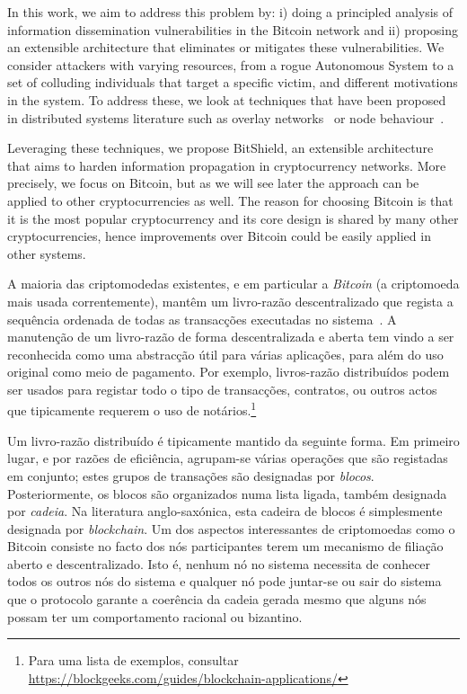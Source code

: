 In this work, we aim to address this problem by: i) doing a principled analysis of information dissemination vulnerabilities in the Bitcoin network and ii) proposing an extensible architecture that eliminates or mitigates these vulnerabilities.
We consider attackers with varying resources, from a rogue Autonomous System to a set of colluding individuals that target a specific victim, and different motivations in the system.
To address these, we look at techniques that have been proposed in distributed systems literature such as overlay networks~\cite{jesi2009secure} or node behaviour~\cite{li2006bar}.

Leveraging these techniques, we propose BitShield, an extensible architecture that aims to harden information propagation in cryptocurrency networks. More precisely, we focus on Bitcoin, but as we will see later the approach can be applied to other cryptocurrencies as well. The reason for choosing Bitcoin is that it is the most popular cryptocurrency and its core design is shared by many other cryptocurrencies, hence improvements over Bitcoin could be easily applied in other systems.

A maioria das criptomodedas existentes, e em particular a \emph{Bitcoin} (a criptomoeda mais usada correntemente), mantêm um livro-razão descentralizado que regista a sequência ordenada de todas as transacções executadas no sistema~\cite{nakamoto2008bitcoin}.
A manutenção de um livro-razão de forma descentralizada e aberta tem vindo a ser reconhecida como uma abstracção útil para várias aplicações, para além do uso original como meio de pagamento.
Por exemplo,  livros-razão distribuídos podem ser usados para  registar todo o tipo de transacções, contratos, ou outros actos que tipicamente requerem o uso de notários.\footnote{Para uma lista de exemplos, consultar \url{https://blockgeeks.com/guides/blockchain-applications/}}

Um livro-razão distribuído é tipicamente mantido da seguinte forma. Em primeiro lugar, e por razões de eficiência, agrupam-se várias operações que são registadas em conjunto; estes grupos de transações são designadas por \emph{blocos}. Posteriormente, os blocos são organizados numa lista ligada, também designada por \emph{cadeia}.  Na literatura anglo-saxónica, esta cadeira de blocos é simplesmente designada por \emph{blockchain}.
Um dos aspectos interessantes de criptomoedas como o Bitcoin consiste no facto dos nós participantes terem um mecanismo de filiação aberto e descentralizado. Isto é, nenhum nó no sistema necessita de conhecer todos os outros nós do sistema e qualquer nó pode juntar-se ou sair do sistema que o protocolo garante a coerência da cadeia gerada mesmo que alguns nós possam ter um comportamento racional ou bizantino.

